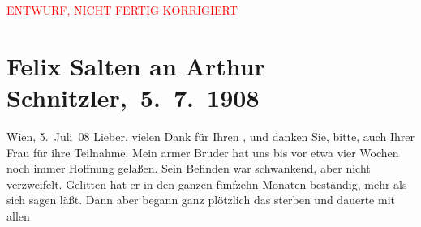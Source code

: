 
\begin{center}
            \textcolor{red}{ENTWURF, NICHT FERTIG KORRIGIERT}
                      \end{center}
            
         
         \renewcommand{\erwaehntePersonen}{Personen: Felix Salten, Ottilie Salten, Michael Emil Salzmann, Marie Salzmann, Olga Schnitzler}
         \renewcommand{\erwaehnteOrte}{Orte: Bayreuth, Franzensbad, Noordwijk, Salzkammergut, Wien}
         \renewcommand{\erwaehnteWerke}{}
               \section[ Felix Salten an Arthur Schnitzler, 5. 7. 1908]{ Felix Salten an Arthur Schnitzler, 5. 7. 1908}\nopagebreak{}\rehead{ }\begin{ledgroupsized}[t]{13cm}\normalsize\beginnumbering \toendnotes[C]{\smallbreak\pagebreak[2]} 
\toendnotes[C]{\smallbreak}\pstart
           \raggedleft{}{\pb}Wien, 5. Juli 08\pend
           \pstart
           Lieber, vielen Dank für Ihren \label{K_L03497-1v}\label{K_L03497-1h}, und danken Sie, bitte, auch Ihrer \label{K_L03497-2v}\label{K_L03497-2h}{ }Frau für ihre Teilnahme. Mein
               armer Bruder hat uns bis vor
               etwa vier Wochen noch immer Hoffnung gelaßen. Sein Befinden war schwankend, aber
               nicht verzweifelt. Gelitten hat er in den ganzen fünfzehn Monaten beständig, mehr als
               sich sagen läßt. Dann aber begann ganz plötzlich das sterben und dauerte mit allen

\end{ledgroupsized}
